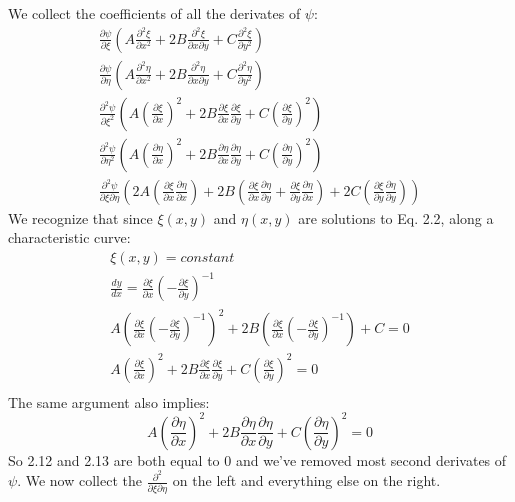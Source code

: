 \documentclass[a4paper,10pt]{article}
\numberwithin{equation}{section}
\begin{document}
We collect the coefficients of all the derivates of $\psi$:
\begin{gather}
\frac{\partial \psi}{\partial \xi}(A\frac{\partial ^2 \xi}{\partial x^2}+2B\frac{\partial ^2 \xi}{\partial x \partial y}+C\frac{\partial ^2 \xi}{\partial y^2})\\
\frac{\partial \psi}{\partial \eta}(A\frac{\partial ^2 \eta}{\partial x^2}+2B\frac{\partial ^2 \eta}{\partial x \partial y}+C\frac{\partial ^2 \eta}{\partial y^2})\\
\frac{\partial ^2 \psi}{\partial \xi ^2}(A(\frac{\partial \xi}{\partial x})^2+2B\frac{\partial \xi}{\partial x}\frac{\partial \xi}{\partial y}+C(\frac{\partial \xi}{\partial y})^2)\\
\frac{\partial ^2 \psi}{\partial \eta ^2}(A(\frac{\partial \eta}{\partial x})^2+2B\frac{\partial \eta}{\partial x}\frac{\partial \eta}{\partial y}+C(\frac{\partial \eta}{\partial y})^2)\\
\frac{\partial ^2 \psi}{\partial \xi \partial \eta}(2A(\frac{\partial \xi}{\partial x}\frac{\partial \eta}{\partial x})
+2B(\frac{\partial \xi}{\partial x}\frac{\partial \eta}{\partial y}+\frac{\partial \xi}{\partial y}\frac{\partial \eta}{\partial x})
+2C(\frac{\partial \xi}{\partial y}\frac{\partial \eta}{\partial y}))
\end{gather}
We recognize that since $\xi(x,y)$ and $\eta(x,y)$ are solutions to Eq. 2.2, along a characteristic curve:
\begin{gather}
 \xi (x,y) = constant\\
 \frac{dy}{dx}=\frac{\partial \xi}{\partial x} (-\frac{\partial \xi}{\partial y})^{-1}\\
  A(\frac{\partial \xi}{\partial x} (-\frac{\partial \xi}{\partial y})^{-1})^2
 +2B(\frac{\partial \xi}{\partial x} (-\frac{\partial \xi}{\partial y})^{-1})
 +C=0\\
 A(\frac{\partial \xi}{\partial x})^2+2B\frac{\partial \xi}{\partial x}\frac{\partial \xi}{ \partial y}+C(\frac{\partial \xi}{\partial y})^2=0\\
\end{gather}
The same argument also implies:
\begin{equation}
  A(\frac{\partial \eta}{\partial x})^2+2B\frac{\partial \eta}{\partial x}\frac{\partial \eta}{ \partial y}+C(\frac{\partial \eta}{\partial y})^2=0
\end{equation}
So 2.12 and 2.13 are both equal to 0 and we've removed most second derivates of $\psi$. 
We now collect the $\frac{\partial ^2}{\partial \xi \partial \eta}$ on the left and everything else on the right.
\end{document}
